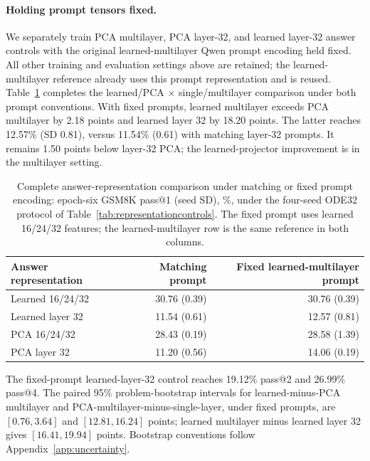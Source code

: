 \documentclass{article}
\newenvironment{revision}{\begingroup\color{blue}}{\endgroup}
\begin{document}
\begin{revision}
\paragraph{Holding prompt tensors fixed.}
We separately train PCA multilayer, PCA layer-32, and learned layer-32 answer controls with the original learned-multilayer Qwen prompt encoding held fixed. All other training and evaluation settings above are retained; the learned-multilayer reference already uses this prompt representation and is reused. Table~\ref{tab:fixedpromptcontrols} completes the learned/PCA $\times$ single/multilayer comparison under both prompt conventions. With fixed prompts, learned multilayer exceeds PCA multilayer by 2.18 points and learned layer 32 by 18.20 points. The latter reaches 12.57\% (SD 0.81), versus 11.54\% (0.61) with matching layer-32 prompts. It remains 1.50 points below layer-32 PCA; the learned-projector improvement is in the multilayer setting.
\begin{table}[htbp]\color{blue}\centering\small
\caption{Complete answer-representation comparison under matching or fixed prompt encoding: epoch-six GSM8K pass@1 (seed SD), \%, under the four-seed ODE32 protocol of Table~\ref{tab:representationcontrols}. The fixed prompt uses learned 16/24/32 features; the learned-multilayer row is the same reference in both columns.}
\label{tab:fixedpromptcontrols}
\begin{tabular}{@{}lrr@{}}\toprule
Answer representation & Matching prompt & Fixed learned-multilayer prompt\\\midrule
Learned 16/24/32 & 30.76 (0.39) & 30.76 (0.39)\\
Learned layer 32 & 11.54 (0.61) & 12.57 (0.81)\\
PCA 16/24/32 & 28.43 (0.19) & 28.58 (1.39)\\
PCA layer 32 & 11.20 (0.56) & 14.06 (0.19)\\\bottomrule
\end{tabular}
\end{table}
The fixed-prompt learned-layer-32 control reaches 19.12\% pass@2 and 26.99\% pass@4. The paired 95\% problem-bootstrap intervals for learned-minus-PCA multilayer and PCA-multilayer-minus-single-layer, under fixed prompts, are $[0.76,3.64]$ and $[12.81,16.24]$ points; learned multilayer minus learned layer 32 gives $[16.41,19.94]$ points. Bootstrap conventions follow Appendix~\ref{app:uncertainty}.
\begin{table}[htbp]\color{blue}\centering\small
\caption{Additional learning curves in Figure~\ref{fig:representationcomparison}: mean GSM8K accuracy (generation-seed SD), \%, over seeds 42/123. All use backbone EMA $.999$, ODE32, synchronous $t=\tau^2$, and CFG1/SCCFG2. Matching prompts use the answer representation; fixed prompts use learned 16/24/32 Qwen features. Table~\ref{tab:representationcurvevalues} gives the remaining curves; Tables~\ref{tab:representationcontrols}--\ref{tab:fixedpromptcontrols} give the four-seed endpoints.}

\end{table}
\end{revision}
\end{document}
